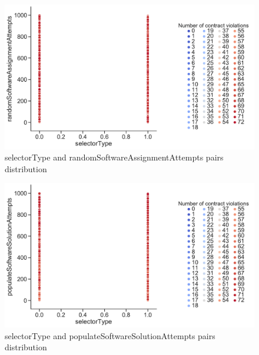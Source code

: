 \begin{figure}
	\centering
	\includegraphics[width=\textwidth]{images/PairsDistr/selectorType_randomSoftwareAssignmentAttempts.pdf}
	\caption[selectorType and randomSoftwareAssignmentAttempts pairs distribution]{selectorType and randomSoftwareAssignmentAttempts pairs distribution}
	\label{fig:selectorType_randomSoftwareAssignmentAttempts_pair}
\end{figure}
\clearpage
\begin{figure}
	\centering
	\includegraphics[width=\textwidth]{images/PairsDistr/selectorType_populateSoftwareSolutionAttempts.pdf}
	\caption[selectorType and populateSoftwareSolutionAttempts pairs distribution]{selectorType and populateSoftwareSolutionAttempts pairs distribution}
	\label{fig:selectorType_populateSoftwareSolutionAttempts_pair}
\end{figure}
\clearpage
